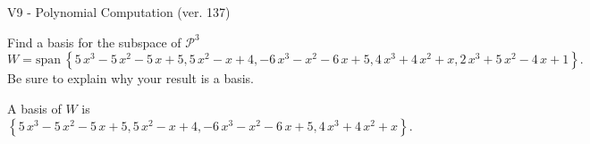 \begin{exercise}
  \begin{exerciseTitle}V9 - Polynomial Computation (ver. 137)\end{exerciseTitle}
  \begin{exerciseStatement}
    Find a basis for the subspace of \(\mathcal{P}^3\) 
\[W=\mathrm{span}\ \left\{5 \, x^{3} - 5 \, x^{2} - 5 \, x + 5 , 5 \, x^{2} - x + 4 , -6 \, x^{3} - x^{2} - 6 \, x + 5 , 4 \, x^{3} + 4 \, x^{2} + x , 2 \, x^{3} + 5 \, x^{2} - 4 \, x + 1\right\}.\]
 Be sure to explain why your result is a basis.


  \end{exerciseStatement}
  \begin{exerciseAnswer}
   A basis of \(W\) is  \(\left\{5 \, x^{3} - 5 \, x^{2} - 5 \, x + 5 , 5 \, x^{2} - x + 4 , -6 \, x^{3} - x^{2} - 6 \, x + 5 , 4 \, x^{3} + 4 \, x^{2} + x\right\}\).
  


  \end{exerciseAnswer}
\end{exercise}